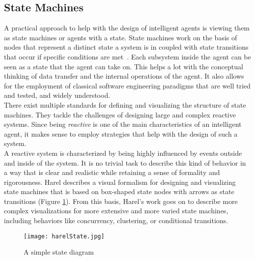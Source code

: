 \subsection{State Machines}
A practical approach to help with the design of intelligent agents is viewing them as state machines or agents with a state. State machines work on the basis of nodes that represent a distinct state a system is in coupled with state transitions that occur if specific conditions are met~\cite{Hopcroft2001}. Each subsystem inside the agent can be seen as a state that the agent can take on. This helps a lot with the conceptual thinking of data transfer and the internal operations of the agent. It also allows for the employment of classical software engineering paradigms that are well tried and tested, and widely understood.~\cite{Wooldridge2009}\\
There exist multiple standards for defining and visualizing the structure of state machines. They tackle the challenges of designing large and complex reactive systems. Since being \textit{reactive} is one of the main characteristics of an intelligent agent, it makes sense to employ strategies that help with the design of such a system.~\cite{Harel1985}\\
A reactive system is characterized by being highly influenced by events outside and inside of the system. It is no trivial task to describe this kind of behavior in a way that is clear and realistic while retaining a sense of formality and rigorousness. Harel describes a visual formalism for designing and visualizing state machines that is based on box-shaped state nodes with arrows as state transitions (Figure \ref{fig:harelState}). From this basis, Harel's work goes on to describe more complex visualizations for more extensive and more varied state machines, including behaviors like concurrency, clustering, or conditional transitions.~\cite{Harel1987}\\
\begin{figure}
	\centering
	\texttt{[image: harelState.jpg]}
	\caption{A simple state diagram~\cite{Harel1987}}
	\label{fig:harelState}
\end{figure}
